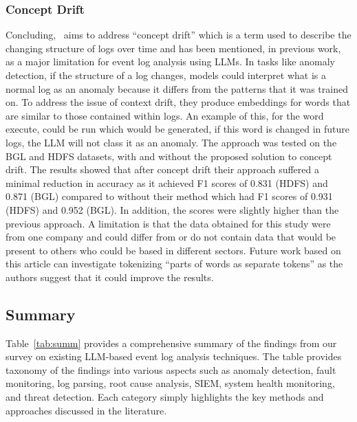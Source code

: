 \subsubsection{Concept Drift}
Concluding,~\cite{sundin2024ai} aims to address ``concept drift'' which is a term used to describe the changing structure of logs over time and has been mentioned, in previous work, as a major limitation for event log analysis using LLMs. In tasks like anomaly detection, if the structure of a log changes, models could interpret what is a normal log as an anomaly because it differs from the patterns that it was trained on. To address the issue of context drift, they produce embeddings for words that are similar to those contained within logs. An example of this, for the word execute, could be run which would be generated, if this word is changed in future logs, the LLM will not class it as an anomaly. The approach was tested on the BGL and HDFS datasets, with and without the proposed solution to concept drift. The results showed that after concept drift their approach suffered a minimal reduction in accuracy as it achieved F1 scores of 0.831 (HDFS) and 0.871 (BGL) compared to without their method which had F1 scores of 0.931 (HDFS) and 0.952 (BGL). In addition, the scores were slightly higher than the previous approach. A limitation is that the data obtained for this study were from one company and could differ from or do not contain data that would be present to others who could be based in different sectors. Future work based on this article can investigate tokenizing ``parts of words as separate tokens'' as the authors suggest that it could improve the results.


\subsection{Summary}
Table~\ref{tab:summ} provides a comprehensive summary of the findings from our survey on existing LLM-based event log analysis techniques. The table provides taxonomy of the findings into various aspects such as anomaly detection, fault monitoring, log parsing, root cause analysis, SIEM, system health monitoring, and threat detection. Each category simply highlights the key methods and approaches discussed in the literature.